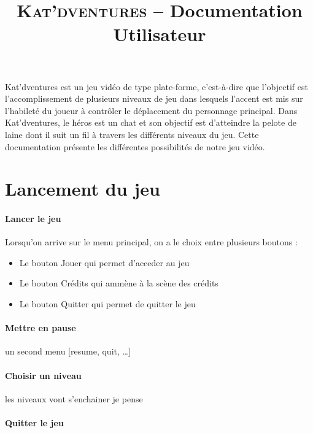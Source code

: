 \documentclass[a4paper,11pt]{article}
\title{ \textsc{Kat'dventures} -- Documentation Utilisateur}
\date{}                    %
\begin{document}
          

\maketitle                 %
\thispagestyle{empty}      %


Kat’dventures est un jeu vidéo de type plate-forme, c’est-à-dire que l’objectif est l’accomplissement de plusieurs niveaux de jeu dans lesquels l'accent est mis sur l'habileté du joueur à contrôler le déplacement du personnage principal. Dans Kat’dventures, le héros est un chat et son objectif est d’atteindre la pelote de laine dont il suit un fil à travers les différents niveaux du jeu.
Cette documentation présente les différentes possibilités de notre jeu vidéo.

\section{Lancement du jeu}
\paragraph{Lancer le jeu} 	 Lorsqu'on arrive sur le menu principal, on a le choix entre plusieurs boutons :

\begin{itemize}
\item Le bouton Jouer qui permet d'acceder au jeu
\item Le bouton Crédits qui ammène à la scène des crédits
\item Le bouton Quitter qui permet de quitter le jeu
\end{itemize} 

\paragraph{Mettre en pause}  un second menu [resume, quit, …]
\paragraph{Choisir un niveau}  les niveaux vont s’enchainer je pense
\paragraph{Quitter le jeu} 
\end{document}
